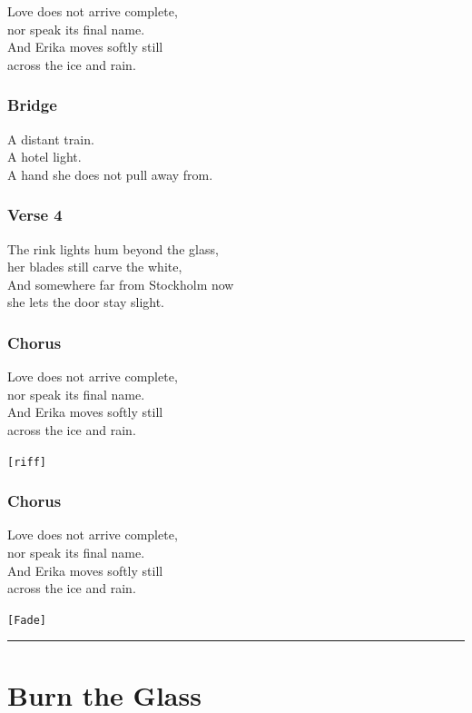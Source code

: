\documentclass[]{article}
\begin{document}
Love does not arrive complete,\\
nor speak its final name.\\
And Erika moves softly still\\
across the ice and rain.

\subsubsection{Bridge}\label{bridge}

A distant train.\\
A hotel light.\\
A hand she does not pull away from.

\subsubsection{Verse 4}\label{verse-4}

The rink lights hum beyond the glass,\\
her blades still carve the white,\\
And somewhere far from Stockholm now\\
she lets the door stay slight.

\subsubsection{Chorus}\label{chorus-2}

Love does not arrive complete,\\
nor speak its final name.\\
And Erika moves softly still\\
across the ice and rain.

\texttt{{[}riff{]}}

\subsubsection{Chorus}\label{chorus-3}

Love does not arrive complete,\\
nor speak its final name.\\
And Erika moves softly still\\
across the ice and rain.

\texttt{{[}Fade{]}}

\begin{center}\rule{0.5\linewidth}{0.5pt}\end{center}

\section{Burn the Glass}\label{burn-the-glass}
\end{document}
